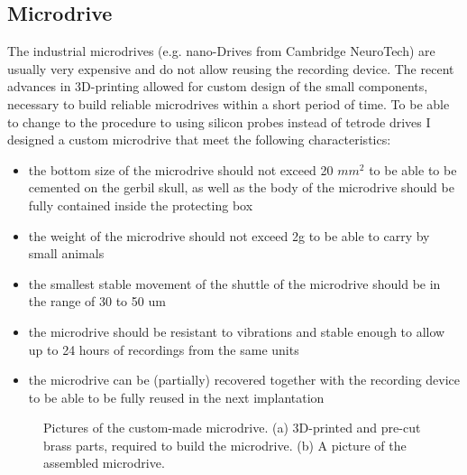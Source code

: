 \subsection{Microdrive}

The industrial microdrives (e.g. nano-Drives from Cambridge NeuroTech) are usually very expensive and do not allow reusing the recording device. The recent advances in 3D-printing allowed for custom design of the small components, necessary to build reliable microdrives within a short period of time. To be able to change to the procedure to using silicon probes instead of tetrode drives I designed a custom microdrive that meet the following characteristics:

\begin{itemize}
    \item the bottom size of the microdrive should not exceed 20 $mm^2$ to be able to be cemented on the gerbil skull, as well as the body of the microdrive should be fully contained inside the protecting box
    \item the weight of the microdrive should not exceed 2g to be able to carry by small animals
    \item the smallest stable movement of the shuttle of the microdrive should be in the range of 30 to 50 um
    \item the microdrive should be resistant to vibrations and stable enough to allow up to 24 hours of recordings from the same units
    \item the microdrive can be (partially) recovered together with the recording device to be able to be fully reused in the next implantation
\end{itemize}

\begin{figure}
\captionsetup{format=plain}
\caption[Microdrive]{
Pictures of the custom-made microdrive. (a) 3D-printed and pre-cut brass parts, required to build the microdrive. (b) A picture of the assembled microdrive.
}
\label{fig:F29_microdrive}
\end{figure}

